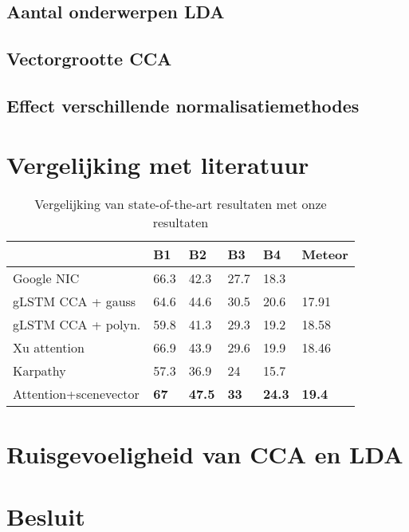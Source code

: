 \subsection{Aantal onderwerpen LDA}

\subsection{Vectorgrootte CCA}

\subsection{Effect verschillende normalisatiemethodes}

\section{Vergelijking met literatuur} %
\label{sec:vergelijking_met_literatuur}

\begin{table}
	\centering
	\begin{tabular}{llllll}
		~                     & B1   & B2   & B3   & B4   & Meteor \\ \hline
		Google NIC\cite{Google}            & 66.3 & 42.3 & 27.7 & 18.3 & ~      \\
		gLSTM CCA + gauss\cite{Fernando2015}     & 64.6 & 44.6 & 30.5 & 20.6 & 17.91  \\
		gLSTM CCA + polyn.\cite{Fernando2015}    & 59.8 & 41.3 & 29.3 & 19.2 & 18.58  \\
		Xu attention\cite{Xu2015}         & 66.9 & 43.9 & 29.6 & 19.9 & 18.46  \\
		Karpathy\cite{Karpathy2015}              & 57.3 & 36.9 & 24   & 15.7 & ~      \\
		Attention+scenevector\cite{Jin2015} & \textbf{67}   & \textbf{47.5} & \textbf{33}   & \textbf{24.3} & \textbf{19.4}   \\
	\end{tabular}
	\label{table:results_literature}
	\caption{Vergelijking van state-of-the-art resultaten met onze resultaten}
\end{table}

\section{Ruisgevoeligheid van CCA en LDA} %
\label{sec:ruisgevoeligheid_van_cca_en_lda_res}


\section{Besluit} %
\label{sec:besluit}


